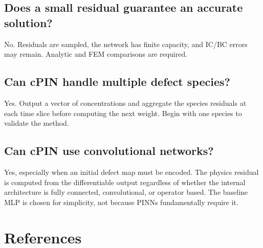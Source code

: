 \documentclass[11pt]{article}
\begin{document}
\subsection*{Does a small residual guarantee an accurate solution?}

No. Residuals are sampled, the network has finite capacity, and IC/BC errors may remain. Analytic and FEM comparisons are required.

\subsection*{Can cPIN handle multiple defect species?}

Yes. Output a vector of concentrations and aggregate the species residuals at each time slice before computing the next weight. Begin with one species to validate the method.

\subsection*{Can cPIN use convolutional networks?}

Yes, especially when an initial defect map must be encoded. The physics residual is computed from the differentiable output regardless of whether the internal architecture is fully connected, convolutional, or operator based. The baseline MLP is chosen for simplicity, not because PINNs fundamentally require it.

\section{References}
\end{document}
